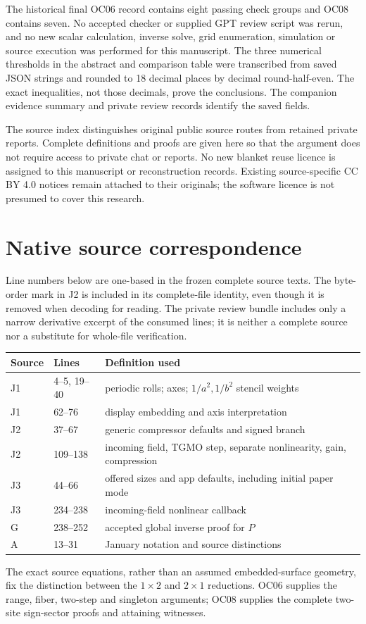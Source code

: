 \documentclass[11pt,a4paper]{article}
\theoremstyle{definition}
\theoremstyle{remark}\newtheorem{remark}[theorem]{Remark}
\numberwithin{equation}{section}
\begin{document}
The historical final OC06 record contains eight passing check groups and OC08
contains seven. No accepted checker or supplied GPT review script was rerun,
and no new scalar calculation, inverse solve, grid enumeration, simulation or
source execution was performed for this manuscript.
The three numerical thresholds in the abstract and comparison table were
transcribed from saved JSON strings and rounded to 18 decimal places by decimal
round-half-even. The exact inequalities, not those decimals, prove the conclusions.
The companion evidence summary and private review records identify the saved fields.

The source index distinguishes original public source routes from retained private
reports. Complete definitions and proofs are given here so that the argument
does not require access to private chat or reports. No new blanket reuse licence
is assigned to this manuscript or reconstruction records. Existing source-specific
CC BY 4.0 notices remain attached to their originals; the software licence is
not presumed to cover this research.

\appendix
\section{Native source correspondence}\label{app:sources}
Line numbers below are one-based in the frozen complete source texts.
The byte-order mark in J2 is included in its complete-file identity, even though
it is removed when decoding for reading. The private review bundle includes
only a narrow derivative excerpt of the consumed lines; it is neither a complete
source nor a substitute for whole-file verification.

\begin{center}\small
\begin{tabularx}{\textwidth}{@{}llY@{}}
\toprule Source & Lines & Definition used\\
\midrule
J1 & 4--5, 19--40 & periodic rolls; axes; $1/a^2,1/b^2$ stencil weights\\
J1 & 62--76 & display embedding and axis interpretation\\
J2 & 37--67 & generic compressor defaults and signed branch\\
J2 & 109--138 & incoming field, TGMO step, separate nonlinearity, gain, compression\\
J3 & 44--66 & offered sizes and app defaults, including initial paper mode\\
J3 & 234--238 & incoming-field nonlinear callback\\
G & 238--252 & accepted global inverse proof for $P$\\
A & 13--31 & January notation and source distinctions\\
\bottomrule
\end{tabularx}
\end{center}
The exact source equations, rather than an assumed embedded-surface geometry,
fix the distinction between the $1\times2$ and $2\times1$ reductions.
OC06 supplies the range, fiber, two-step and singleton arguments; OC08 supplies
the complete two-site sign-sector proofs and attaining witnesses.
\end{document}
